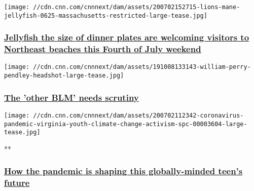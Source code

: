 \href{/2020/07/03/weather/lions-mane-jellyfish-northeast-beaches-climate-change-trnd/index.html}{}

\texttt{[image: //cdn.cnn.com/cnnnext/dam/assets/200702152715-lions-mane-jellyfish-0625-massachusetts-restricted-large-tease.jpg]}

\hypertarget{jellyfish-the-size-of-dinner-plates-are-welcoming-visitors-to-northeast-beaches-this-fourth-of-july-weekend}{%
\subsubsection{\texorpdfstring{\href{/2020/07/03/weather/lions-mane-jellyfish-northeast-beaches-climate-change-trnd/index.html}{Jellyfish
the size of dinner plates are welcoming visitors to Northeast beaches
this Fourth of July
weekend}}{Jellyfish the size of dinner plates are welcoming visitors to Northeast beaches this Fourth of July weekend}}\label{jellyfish-the-size-of-dinner-plates-are-welcoming-visitors-to-northeast-beaches-this-fourth-of-july-weekend}}

\href{/2020/07/02/opinions/william-perry-pendley-bureau-of-land-management-sutter/index.html}{}

\texttt{[image: //cdn.cnn.com/cnnnext/dam/assets/191008133143-william-perry-pendley-headshot-large-tease.jpg]}

\hypertarget{the-other-blm-needs-scrutiny}{%
\subsubsection{\texorpdfstring{\href{/2020/07/02/opinions/william-perry-pendley-bureau-of-land-management-sutter/index.html}{The
'other BLM' needs
scrutiny}}{The 'other BLM' needs scrutiny}}\label{the-other-blm-needs-scrutiny}}

\href{/videos/tv/2020/07/02/coronavirus-pandemic-virginia-youth-climate-change-activism-spc.cnn}{}

\texttt{[image: //cdn.cnn.com/cnnnext/dam/assets/200702112342-coronavirus-pandemic-virginia-youth-climate-change-activism-spc-00003604-large-tease.jpg]}

**

\hypertarget{how-the-pandemic-is-shaping-this-globally-minded-teens-future}{%
\subsubsection{\texorpdfstring{\href{/videos/tv/2020/07/02/coronavirus-pandemic-virginia-youth-climate-change-activism-spc.cnn}{How
the pandemic is shaping this globally-minded teen's
future}}{How the pandemic is shaping this globally-minded teen's future}}\label{how-the-pandemic-is-shaping-this-globally-minded-teens-future}}


